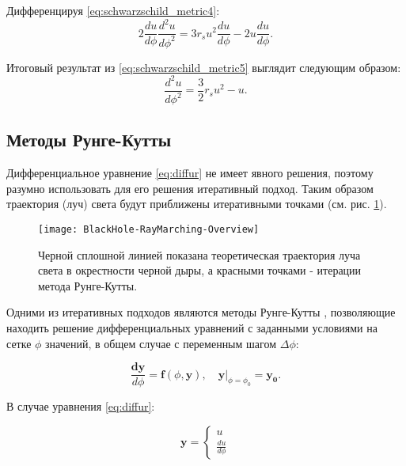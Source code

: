 Дифференцируя \eqref{eq:schwarzschild_metric4}:
\begin{equation}
\label{eq:schwarzschild_metric5}
    2\frac{du}{d\phi}\frac{d^2u}{d\phi^2} = 3r_su^2\frac{du}{d\phi} - 2u\frac{du}{d\phi}.
\end{equation}

Итоговый результат из \eqref{eq:schwarzschild_metric5} выглядит следующим образом:
\begin{equation}
\label{eq:diffur}
    \frac{d^2u}{d\phi^2} = \frac{3}{2}r_su^2 - u.
\end{equation}

\subsection{Методы Рунге-Кутты}
\label{subsec:runge-kutte}

Дифференциальное уравнение \eqref{eq:diffur} не имеет явного решения, поэтому разумно использовать для его решения итеративный подход. Таким образом траектория (луч) света будут приближены итеративными точками (см. рис. \ref{fig:runge-kutte}).

\begin{figure}[h]
    \centering
    \texttt{[image: BlackHole-RayMarching-Overview]}
    \caption{Черной сплошной линией показана теоретическая траектория луча света в окрестности черной дыры, а красными точками - итерации метода Рунге-Кутты.}
    \label{fig:runge-kutte}
\end{figure}

Одними из итеративных подходов являются методы Рунге-Кутты \cite[стр.~219]{аристова2014практические}, позволяющие находить решение дифференциальных уравнений с заданными условиями на сетке $\phi$ значений, в общем случае с переменным шагом $\Delta \phi$:

\begin{equation}
\label{eq:runge-kutte}
    \frac{\mathbf{dy}}{d\phi} = \mathbf{f}(\phi, \mathbf{y}),
    \quad
    \left.\mathbf{y}\right|_{\phi=\phi_0}=\mathbf{y_0}.
\end{equation}

В случае уравнения \eqref{eq:diffur}:

\begin{equation*}
\label{eq:runge-kutte_y}
    \mathbf{y} =
    \begin{cases}
        u
        \\
        \frac{du}{d\phi}
    \end{cases}
\end{equation*}


